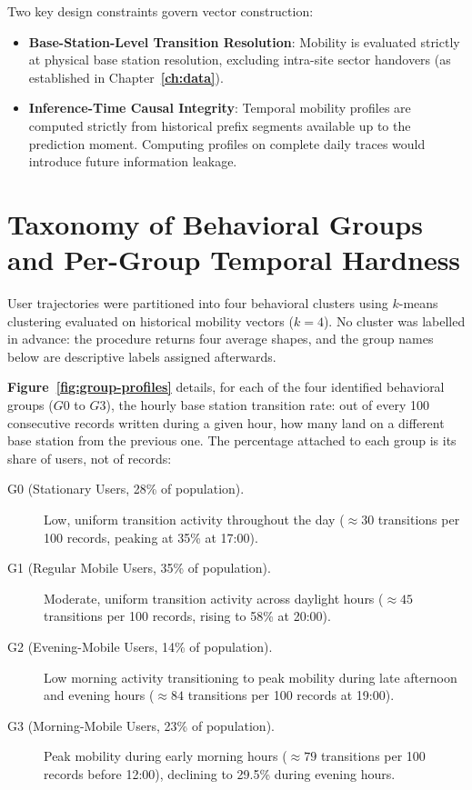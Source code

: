Two key design constraints govern vector construction:
\begin{itemize}
  \item \textbf{Base-Station-Level Transition Resolution}: Mobility is evaluated strictly at physical base station resolution, excluding intra-site sector handovers (as established in Chapter~\textbf{\ref{ch:data}}).
  \item \textbf{Inference-Time Causal Integrity}: Temporal mobility profiles are computed strictly from historical prefix segments available up to the prediction moment. Computing profiles on complete daily traces would introduce future information leakage.
\end{itemize}

\section{Taxonomy of Behavioral Groups and Per-Group Temporal Hardness}

User trajectories were partitioned into four behavioral clusters using $k$-means clustering evaluated on historical mobility vectors ($k=4$). No cluster was labelled in advance: the procedure returns four average shapes, and the group names below are descriptive labels assigned afterwards.

\textbf{Figure~\ref{fig:group-profiles}} details, for each of the four identified behavioral groups ($G0$ to $G3$), the hourly base station transition rate: out of every 100 consecutive records written during a given hour, how many land on a different base station from the previous one. The percentage attached to each group is its share of users, not of records:



{\sloppy
\begin{description}
  \item[G0 (Stationary Users, 28\% of population).] Low, uniform transition activity throughout the day ($\approx 30$ transitions per 100 records, peaking at 35\% at 17:00).
  \item[G1 (Regular Mobile Users, 35\% of population).] Moderate, uniform transition activity across daylight hours ($\approx 45$ transitions per 100 records, rising to 58\% at 20:00).
  \item[G2 (Evening-Mobile Users, 14\% of population).] Low morning activity transitioning to peak mobility during late afternoon and evening hours ($\approx 84$ transitions per 100 records at 19:00).
  \item[G3 (Morning-Mobile Users, 23\% of population).] Peak mobility during early morning hours ($\approx 79$ transitions per 100 records before 12:00), declining to 29.5\% during evening hours.
\end{description}\par}

